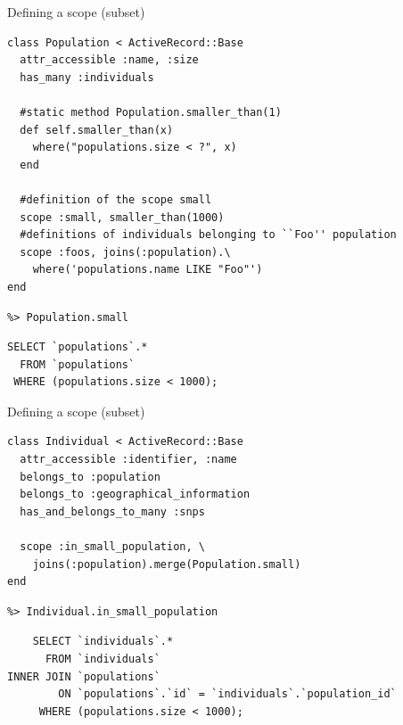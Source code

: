 \documentclass[12pt]{beamer}
\begin{document}
\begin{frame}[fragile]
  \begin{block}{Defining a scope (subset)}
	\begin{verbatim}
class Population < ActiveRecord::Base
  attr_accessible :name, :size
  has_many :individuals
  
  #static method Population.smaller_than(1)
  def self.smaller_than(x)
    where("populations.size < ?", x)
  end

  #definition of the scope small
  scope :small, smaller_than(1000)
  #definitions of individuals belonging to ``Foo'' population
  scope :foos, joins(:population).\
  	where('populations.name LIKE "Foo"')
end
	\end{verbatim}
  \end{block}
  \begin{block}{}
	\begin{verbatim}
%> Population.small
	\end{verbatim}
  \end{block}
  \begin{block}{}
	\begin{verbatim}
SELECT `populations`.* 
  FROM `populations` 
 WHERE (populations.size < 1000);
	\end{verbatim}
  \end{block}  
\end{frame}

\begin{frame}[fragile]
  \begin{block}{Defining a scope (subset)}
	\begin{verbatim}
class Individual < ActiveRecord::Base
  attr_accessible :identifier, :name
  belongs_to :population
  belongs_to :geographical_information
  has_and_belongs_to_many :snps

  scope :in_small_population, \ 
  	joins(:population).merge(Population.small)
end
	\end{verbatim}
  \end{block}
  
  \begin{block}{}
	\begin{verbatim}
%> Individual.in_small_population
	\end{verbatim}
  \end{block}
  \begin{block}{}
	\begin{verbatim}
    SELECT `individuals`.* 
      FROM `individuals` 
INNER JOIN `populations`
        ON `populations`.`id` = `individuals`.`population_id`
     WHERE (populations.size < 1000);
	\end{verbatim}
  \end{block}  
\end{frame}
\end{document}
